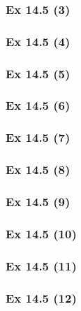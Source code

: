 \subsubsection{Ex 14.5 (3)}\label{sec:Ex_14.5.3}

\subsubsection{Ex 14.5 (4)}\label{sec:Ex_14.5.4}

\subsubsection{Ex 14.5 (5)}\label{sec:Ex_14.5.5}

\subsubsection{Ex 14.5 (6)}\label{sec:Ex_14.5.6}

\subsubsection{Ex 14.5 (7)}\label{sec:Ex_14.5.7}

\subsubsection{Ex 14.5 (8)}\label{sec:Ex_14.5.8}

\subsubsection{Ex 14.5 (9)}\label{sec:Ex_14.5.9}

\subsubsection{Ex 14.5 (10)}\label{sec:Ex_14.5.10}

\newpage		%

\subsubsection{Ex 14.5 (11)}\label{sec:Ex_14.5.11}

\subsubsection{Ex 14.5 (12)}\label{sec:Ex_14.5.12}

